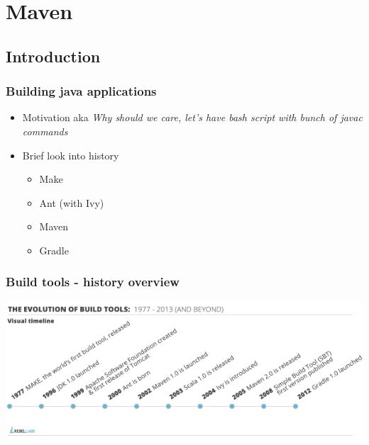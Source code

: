 \section[Maven]{Maven}
\subsection[]{Introduction}
\begin{frame}
\frametitle{Building java applications}
\begin{itemize}
	\item Motivation aka \emph{Why should we care, let's have bash script with bunch of javac commands}
	\item Brief look into history
		\begin{itemize}
		\item Make %
		\item Ant (with Ivy) %
		\item Maven %
		\item Gradle %
		\end{itemize}
\end{itemize}
\end{frame}


\begin{frame}
\frametitle{Build tools - history overview}
	\begin{center}
		\includegraphics[width=\textwidth,height=0.385\textwidth]{build-tools-history.png}
	\end{center}
\end{frame}

